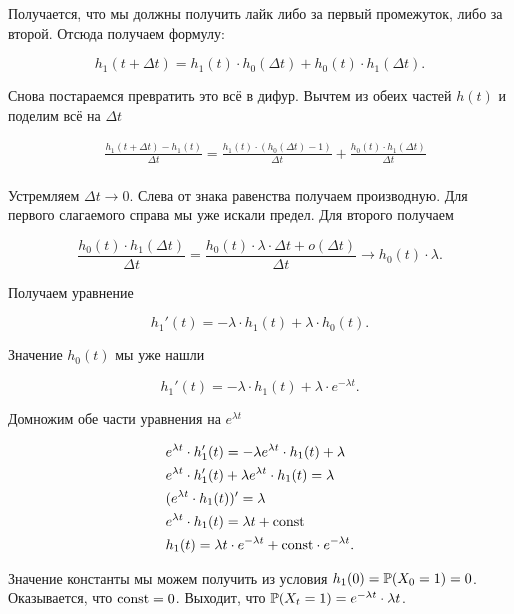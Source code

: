\documentclass[12pt, a4paper, oneside]{article}
\begin{document}
Получается, что мы должны получить лайк либо за первый промежуток, либо за второй. Отсюда получаем формулу:

\[
h_1(t + \Delta t) = h_1(t) \cdot h_0(\Delta t) + h_0(t) \cdot h_1(\Delta t).
\]

Снова постараемся превратить это всё в дифур. Вычтем из обеих частей $h(t)$ и поделим всё на $\Delta t$

\begin{equation*}
\begin{aligned} 
    & \frac{h_1(t + \Delta t) - h_1(t)}{\Delta t} = \frac{h_1(t) \cdot (h_0(\Delta t) - 1) }{\Delta t} + \frac{h_0(t) \cdot h_1(\Delta t) }{\Delta t} \\
\end{aligned}
\end{equation*}

Устремляем $\Delta t \to 0$. Слева от знака равенства получаем производную. Для первого слагаемого справа мы уже искали предел. Для второго получаем 

\[
\frac{h_0(t) \cdot h_1(\Delta t) }{\Delta t} = \frac{h_0(t) \cdot \lambda \cdot \Delta t + o(\Delta t) }{\Delta t} \to h_0(t) \cdot \lambda.
\]

Получаем уравнение 

\[
h_1'(t) = - \lambda \cdot h_1(t) + \lambda \cdot h_0(t).
\]

Значение $h_0(t)$ мы уже нашли

\[
h_1'(t) = - \lambda \cdot h_1(t) + \lambda \cdot e^{-\lambda t}.
\]

Домножим обе части уравнения на $e^{\lambda t}$

\begin{equation*}
\begin{aligned} 
& e^{\lambda t} \cdot h_1'(t) = - \lambda e^{\lambda t} \cdot h_1(t) + \lambda \\
& e^{\lambda t} \cdot h_1'(t) + \lambda e^{\lambda t} \cdot h_1(t) = \lambda \\
& (e^{\lambda t} \cdot h_1(t))'  = \lambda \\
& e^{\lambda t} \cdot h_1(t)  = \lambda t + \mathrm{const} \\
& h_1(t)  = \lambda t \cdot e^{- \lambda t} + \mathrm{const} \cdot e^{- \lambda t}. \\
\end{aligned}
\end{equation*}

Значение константы мы можем получить из условия $h_1(0) = \mathbb{P}(X_0 = 1) = 0$. Оказывается, что $\mathrm{const} = 0$. Выходит, что $\mathbb{P}(X_t = 1) = e^{-\lambda t} \cdot \lambda t$.
\end{document}
